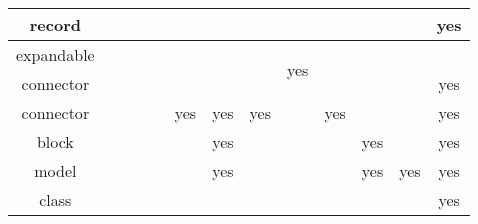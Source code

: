 \begin{table}[H]
{\begin{tabular}{|c|c|c|c|c|c|c|c|c|c|c|c|c|}
    record            &                          &                           &                                            &                      &                          &                          &                          &                          &                            &                          &                        & \multirow{-2}{*}{\cellcolor{lightgray}yes} \\
    \hline
    expandable        &                          &                           &                                            &                      &                          &                          &                          & \multirow{2}{*}{yes}     &                            &                          &                        & \cellcolor{lightgray}                      \\
    connector         &                          &                           &                                            &                      &                          &                          &                          &                          &                            &                          &                        & \multirow{-2}{*}{\cellcolor{lightgray}yes} \\
    \hline
    connector         &                          &                           &                                            &                      & \cellcolor{lightgray}yes & \cellcolor{lightgray}yes & \cellcolor{lightgray}yes &                          & yes                        &                          &                        & \cellcolor{lightgray}yes                   \\
    \hline
    block             &                          &                           &                                            &                      &                          & \cellcolor{lightgray}yes &                          &                          &                            & yes                      &                        & \cellcolor{lightgray}yes                   \\
    \hline
    model             &                          &                           &                                            &                      &                          & \cellcolor{lightgray}yes &                          &                          &                            & \cellcolor{lightgray}yes & yes                    & \cellcolor{lightgray}yes                   \\
    \hline
    class             &                          &                           &                                            &                      &                          &                          &                          &                          &                            &                          &                        & yes                                        \\
    \hline
  \end{tabular}
  \ifpdf}\else\fi%
\end{table}

